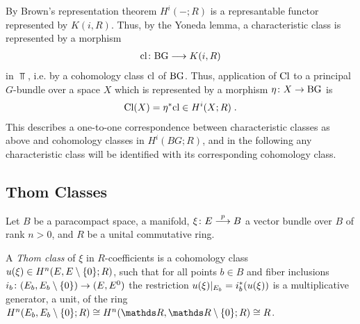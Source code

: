 \begin{Rem}
  By Brown's representation theorem %
  $H^i(-;R)$ is a represantable functor represented by $K(i,R)$.
  Thus, by the Yoneda lemma, a characteristic class is
  represented by a morphism
  \begin{gather*}
    \text{cl}\colon \text{BG} \longrightarrow K(i, R)
  \end{gather*}
  in $\Top$, i.e. by a cohomology class $\text{cl}$ of $\text{BG}$.
  Thus, application of $\text{Cl}$ to a principal $G$-bundle over a
  space $X$ which is represented by a morphism $\eta\colon X\to\text{BG}$ %
  is
  \begin{gather*}
    \text{Cl}(X) = {\eta}^* \text{cl} \in H^i(X;R)
    \;.
  \end{gather*}
  This describes a one-to-one correspondence between
  characteristic classes as above and cohomology classes in
  $H^i(BG;R)$, and in the following any characteristic class will be
  identified with its corresponding cohomology class.
\end{Rem}

\begin{Rem}
\end{Rem}

\subsection{Thom Classes}
Let $B$ be a paracompact space, \forexample a manifold,
$\xi\colon E\overset{p}{\longrightarrow} B$ a vector bundle over $B$ of rank $n>0$,
and $R$ be a unital commutative ring.
\begin{Def}
  A \emph{Thom class} of $\xi$ in $R$-coefficients is a
  cohomology class $u(\xi)\in H^n(E, {E}\setminus\{0\}; R)$,
  such that for all points $b\in B$ and fiber inclusions
  $i_b\colon (E_b, {E_b}\setminus\{0\}) \to (E, {E}^0)$
  the restriction $u(\xi)|_{E_b} = {i}^*_b (u(\xi))$ is a
  multiplicative generator,
  \idest a unit, %
  of the ring
  $H^n(\spherepair{E_b};R)\cong H^n(\spherepair{\R}; R)\cong R$.
\end{Def}

